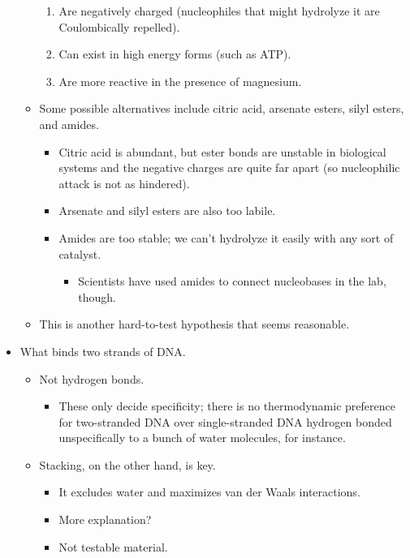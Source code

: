 \documentclass[../notes.tex]{subfiles}
\begin{document}
\begin{itemize}
\begin{itemize}
\begin{enumerate}
            \item Are negatively charged (nucleophiles that might hydrolyze it are Coulombically repelled).
            \item Can exist in high energy forms (such as ATP).
            \item Are more reactive in the presence of magnesium.
        \end{enumerate}
        \item Some possible alternatives include citric acid, arsenate esters, silyl esters, and amides.
        \begin{itemize}
            \item Citric acid is abundant, but ester bonds are unstable in biological systems and the negative charges are quite far apart (so nucleophilic attack is not as hindered).
            \item Arsenate and silyl esters are also too labile.
            \item Amides are too stable; we can't hydrolyze it easily with any sort of catalyst.
            \begin{itemize}
                \item Scientists have used amides to connect nucleobases in the lab, though.
            \end{itemize}
        \end{itemize}
        \item This is another hard-to-test hypothesis that seems reasonable.
    \end{itemize}
    \item What binds two strands of DNA.
    \begin{itemize}
        \item Not hydrogen bonds.
        \begin{itemize}
            \item These only decide specificity; there is no thermodynamic preference for two-stranded DNA over single-stranded DNA hydrogen bonded unspecifically to a bunch of water molecules, for instance.
        \end{itemize}
        \item Stacking, on the other hand, is key.
        \begin{itemize}
            \item It excludes water and maximizes van der Waals interactions.
            \item More explanation?
            \item Not testable material.

\end{itemize}
\end{itemize}
\end{itemize}
\end{document}

